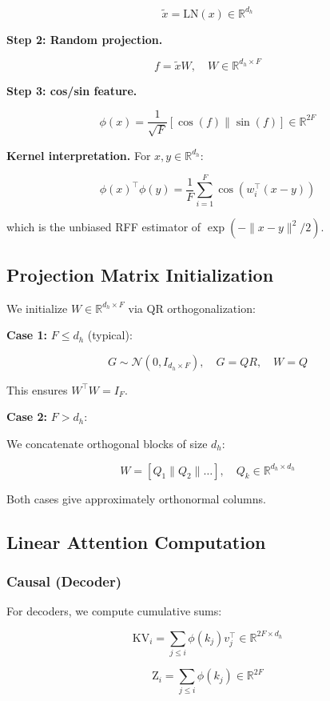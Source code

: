 \[
\tilde{x} = \text{LN}(x) \in \mathbb{R}^{d_h}
\tag{4.1}
\]

\textbf{Step 2: Random projection.}

\[
f = \tilde{x} W, \quad W \in \mathbb{R}^{d_h \times F}
\tag{4.2}
\]

\textbf{Step 3: cos/sin feature.}

\[
\phi(x) = \frac{1}{\sqrt{F}} [\cos(f) \| \sin(f)] \in \mathbb{R}^{2F}
\tag{4.3}
\]

\textbf{Kernel interpretation.} For $x, y \in \mathbb{R}^{d_h}$:

\[
\phi(x)^\top \phi(y) = \frac{1}{F} \sum_{i=1}^F \cos(w_i^\top (x - y))
\tag{4.4}
\]

which is the unbiased RFF estimator of $\exp(-\|x - y\|^2 / 2)$.

\subsection{Projection Matrix Initialization}

We initialize $W \in \mathbb{R}^{d_h \times F}$ via QR orthogonalization:

\textbf{Case 1:} $F \leq d_h$ (typical):

\[
G \sim \mathcal{N}(0, I_{d_h \times F}), \quad G = Q R, \quad W = Q
\tag{4.5}
\]

This ensures $W^\top W = I_F$.

\textbf{Case 2:} $F > d_h$:

We concatenate orthogonal blocks of size $d_h$:

\[
W = [Q_1 \| Q_2 \| \dots], \quad Q_k \in \mathbb{R}^{d_h \times d_h}
\tag{4.6}
\]

Both cases give approximately orthonormal columns.

\subsection{Linear Attention Computation}

\subsubsection{Causal (Decoder)}

For decoders, we compute cumulative sums:

\[
\text{KV}_i = \sum_{j \leq i} \phi(k_j) v_j^\top \in \mathbb{R}^{2F \times d_h}
\tag{4.7}
\]

\[
\text{Z}_i = \sum_{j \leq i} \phi(k_j) \in \mathbb{R}^{2F}
\tag{4.8}
\]

